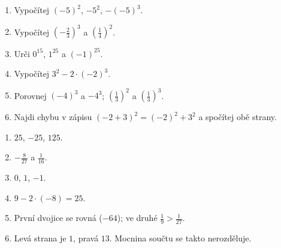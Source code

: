 \documentclass[11pt,a4paper]{article}
\begin{document}

\begin{zadaniReseniBox}[title={Domácí úlohy},breakable=false]
\begin{enumerate}[label=\alph*)]
\item Vypočítej $(-5)^2$, $-5^2$, $-(-5)^3$.
\item Vypočítej $(-\tfrac23)^3$ a $(\tfrac14)^2$.
\item Urči $0^{15}$, $1^{25}$ a $(-1)^{25}$.
\item Vypočítej $3^2-2\cdot(-2)^3$.
\item Porovnej $(-4)^3$ a $-4^3$; $(\tfrac13)^2$ a $(\tfrac13)^3$.
\item Najdi chybu v zápisu $(-2+3)^2=(-2)^2+3^2$ a spočítej obě strany.
\end{enumerate}
\tcblower
\begin{enumerate}[label=\alph*)]
\item $25$, $-25$, $125$.
\item $-\frac8{27}$ a $\frac1{16}$.
\item $0$, $1$, $-1$.
\item $9-2\cdot(-8)=25$.
\item První dvojice se rovná ($-64$); ve druhé $\frac19>\frac1{27}$.
\item Levá strana je $1$, pravá $13$. Mocnina součtu se takto nerozděluje.
\end{enumerate}
\end{zadaniReseniBox}
\end{document}
